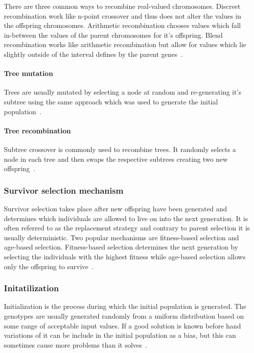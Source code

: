 There are three common ways to recombine real-valued chromosomes. Discreet recombination work like n-point crossover and thus does not alter the values in the offspring chromosomes. Arithmetic recombination chooses values which fall in-between the values of the parent chromosomes for it's offspring. Blend recombination works like arithmetic recombination but allow for values which lie slightly outside of the interval defines by the parent genes~\cite{Eiben201511}.


\paragraph{Tree mutation}

Trees are usually mutated by selecting a node at random and re-generating it's subtree using the same approach which was used to generate the initial population~\cite{Eiben201511}.

\paragraph{Tree recombination}

Subtree crossover is commonly used to recombine trees. It randomly selects a node in each tree and then swaps the respective subtrees creating two new offspring~\cite{Eiben201511}.


\subsubsection{Survivor selection mechanism}

Survivor selection takes place after new offspring have been generated and determines which individuals are allowed to live on into the next generation. It is often referred to as the replacement strategy and contrary to parent selection it is usually deterministic. Two popular mechanisms are fitness-based selection and age-based selection. Fitness-based selection determines the next generation by selecting the individuals with the highest fitness while age-based selection allows only the offspring to survive~\cite{Eiben2015_whatevolutionary}.


\subsubsection{Initatilization}

Initialization is the process during which the initial population is generated. The genotypes are usually generated randomly from a uniform distribution based on some range of acceptable input values. If a good solution is known before hand variations of it can be include in the initial population as a bias, but this can sometimes cause more problems than it solves~\cite{Eiben20021}.

